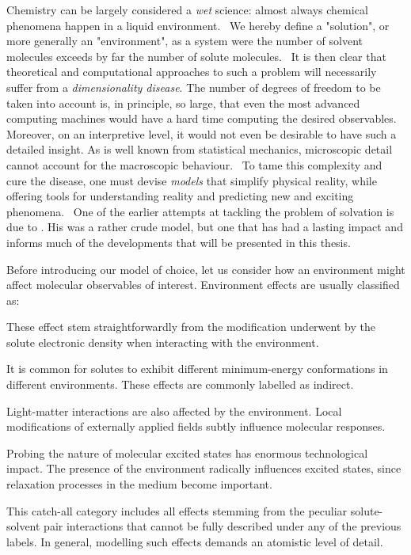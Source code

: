Chemistry can be largely considered a \emph{wet} science: almost always
chemical phenomena happen in a liquid environment.~\autocite{Reichardt2010-le}
We hereby define a "solution", or more generally an "environment", as
a system were the number of solvent molecules exceeds by far the number
of solute molecules.~\autocite{Tomasi2004-dc, Tomasi2007-es}
It is then clear that theoretical and computational approaches to such a
problem will necessarily suffer from a \emph{dimensionality disease}.
The number of degrees of freedom to be taken into account is, in
principle, so large, that even the most advanced computing machines
would have a hard time computing the desired observables.
Moreover, on an interpretive level, it would not even be desirable to
have such a detailed insight.
As is well known from statistical mechanics, microscopic detail cannot
account for the macroscopic behaviour.~\autocite{Hill1960-ql,
Hansen2013-io}
To tame this complexity and cure the disease, one must devise
\emph{models} that simplify physical reality, while offering tools for
understanding reality and predicting new and exciting
phenomena.~\autocite{Anderson1972-ai, Winsberg2010-sy, Kovac2011-ew}
One of the earlier attempts at tackling the problem of solvation is due
to \citeauthor{Onsager1936-wf}. His was a rather crude model, but one
that has had a lasting impact and informs much of the developments that
will be presented in this thesis.~\autocite{Onsager1936-wf}

Before introducing our model of choice, let us consider how an
environment might affect molecular observables of interest.
Environment effects are usually classified as:
\begin{description}[font=\normalfont\scshape]
\item[Direct.]
  These effect stem straightforwardly from the modification underwent by
  the solute electronic density when interacting with the environment.
\item[Indirect.]
  It is common for solutes to exhibit different minimum-energy
  conformations in different environments. These effects are commonly
  labelled as indirect.
\item[Local field.]
  Light-matter interactions are also affected by the environment. Local
  modifications of externally applied fields subtly influence molecular
  responses.~\autocite{Cammi1998-jp, Pipolo2014-sd}
\item[Dynamic.]
  Probing the nature of molecular excited states has enormous
  technological impact. The presence of the environment radically
  influences excited states, since relaxation processes in the medium
  become important.
\item[Specific.] This catch-all category includes all effects
  stemming from the peculiar solute-solvent pair interactions that
  cannot be fully described under any of the previous labels.
  In general, modelling such effects demands an atomistic level of
  detail.
\end{description}

